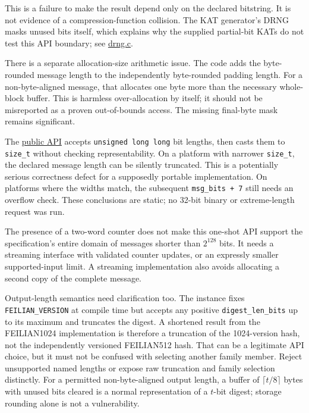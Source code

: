 \documentclass[
  english,
  11pt,
  a4paper,
]{article}
\begin{document}
This is a failure to make the result depend only on the declared
bitstring. It is not evidence of a compression-function collision. The
KAT generator's DRNG masks unused bits itself, which explains why the
supplied partial-bit KATs do not test this API boundary; see
\href{data/SOURCES.md\#source-10}{drng.c}.

There is a separate allocation-size arithmetic issue. The code adds the
byte-rounded message length to the independently byte-rounded padding
length. For a non-byte-aligned message, that allocates one byte more
than the necessary whole-block buffer. This is harmless over-allocation
by itself; it should not be misreported as a proven out-of-bounds
access. The missing final-byte mask remains significant.

The \href{data/SOURCES.md\#source-11}{public API} accepts
\texttt{unsigned\ long\ long} bit lengths, then casts them to
\texttt{size\_t} without checking representability. On a platform with
narrower \texttt{size\_t}, the declared message length can be silently
truncated. This is a potentially serious correctness defect for a
supposedly portable implementation. On platforms where the widths match,
the subsequent \texttt{msg\_bits\ +\ 7} still needs an overflow check.
These conclusions are static; no 32-bit binary or extreme-length request
was run.

The presence of a two-word counter does not make this one-shot API
support the specification's entire domain of messages shorter than
\(2^{128}\) bits. It needs a streaming interface with validated counter
updates, or an expressly smaller supported-input limit. A streaming
implementation also avoids allocating a second copy of the complete
message.

Output-length semantics need clarification too. The instance fixes
\texttt{FEILIAN\_VERSION} at compile time but accepts any positive
\texttt{digest\_len\_bits} up to its maximum and truncates the digest. A
shortened result from the FEILIAN1024 implementation is therefore a
truncation of the 1024-version hash, not the independently versioned
FEILIAN512 hash. That can be a legitimate API choice, but it must not be
confused with selecting another family member. Reject unsupported named
lengths or expose raw truncation and family selection distinctly. For a
permitted non-byte-aligned output length, a buffer of
\(\lceil t/8\rceil\) bytes with unused bits cleared is a normal
representation of a \(t\)-bit digest; storage rounding alone is not a
vulnerability.

\end{document}
